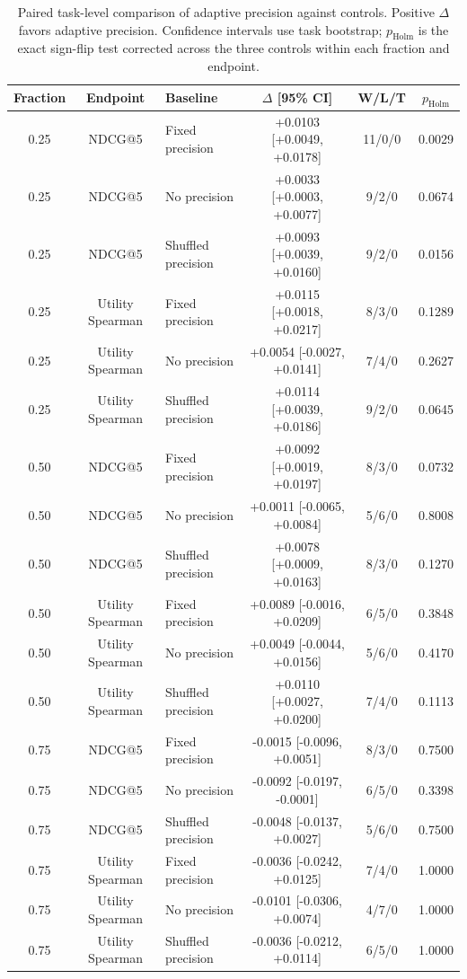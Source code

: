 \begin{table}[t]
\centering
\small
\caption{Paired task-level comparison of adaptive precision against controls. Positive $\Delta$ favors adaptive precision. Confidence intervals use task bootstrap; $p_{\mathrm{Holm}}$ is the exact sign-flip test corrected across the three controls within each fraction and endpoint.}
\label{tab:finite_sample_precision_paired}
\begin{tabular}{cclccc}
\toprule
Fraction & Endpoint & Baseline & $\Delta$ [95\% CI] & W/L/T & $p_{\mathrm{Holm}}$ \\
\midrule
0.25 & NDCG@5 & Fixed precision & +0.0103 [+0.0049, +0.0178] & 11/0/0 & 0.0029 \\
0.25 & NDCG@5 & No precision & +0.0033 [+0.0003, +0.0077] & 9/2/0 & 0.0674 \\
0.25 & NDCG@5 & Shuffled precision & +0.0093 [+0.0039, +0.0160] & 9/2/0 & 0.0156 \\
0.25 & Utility Spearman & Fixed precision & +0.0115 [+0.0018, +0.0217] & 8/3/0 & 0.1289 \\
0.25 & Utility Spearman & No precision & +0.0054 [-0.0027, +0.0141] & 7/4/0 & 0.2627 \\
0.25 & Utility Spearman & Shuffled precision & +0.0114 [+0.0039, +0.0186] & 9/2/0 & 0.0645 \\
0.50 & NDCG@5 & Fixed precision & +0.0092 [+0.0019, +0.0197] & 8/3/0 & 0.0732 \\
0.50 & NDCG@5 & No precision & +0.0011 [-0.0065, +0.0084] & 5/6/0 & 0.8008 \\
0.50 & NDCG@5 & Shuffled precision & +0.0078 [+0.0009, +0.0163] & 8/3/0 & 0.1270 \\
0.50 & Utility Spearman & Fixed precision & +0.0089 [-0.0016, +0.0209] & 6/5/0 & 0.3848 \\
0.50 & Utility Spearman & No precision & +0.0049 [-0.0044, +0.0156] & 5/6/0 & 0.4170 \\
0.50 & Utility Spearman & Shuffled precision & +0.0110 [+0.0027, +0.0200] & 7/4/0 & 0.1113 \\
0.75 & NDCG@5 & Fixed precision & -0.0015 [-0.0096, +0.0051] & 8/3/0 & 0.7500 \\
0.75 & NDCG@5 & No precision & -0.0092 [-0.0197, -0.0001] & 6/5/0 & 0.3398 \\
0.75 & NDCG@5 & Shuffled precision & -0.0048 [-0.0137, +0.0027] & 5/6/0 & 0.7500 \\
0.75 & Utility Spearman & Fixed precision & -0.0036 [-0.0242, +0.0125] & 7/4/0 & 1.0000 \\
0.75 & Utility Spearman & No precision & -0.0101 [-0.0306, +0.0074] & 4/7/0 & 1.0000 \\
0.75 & Utility Spearman & Shuffled precision & -0.0036 [-0.0212, +0.0114] & 6/5/0 & 1.0000 \\
\bottomrule
\end{tabular}
\end{table}
